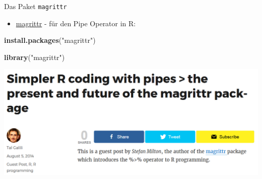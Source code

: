 \documentclass[ignorenonframetext,]{beamer}
\newenvironment{Shaded}{}{}
\newcommand{\KeywordTok}[1]{\textcolor[rgb]{0.00,0.44,0.13}{\textbf{{#1}}}}
\newcommand{\StringTok}[1]{\textcolor[rgb]{0.25,0.44,0.63}{{#1}}}
\newcommand{\NormalTok}[1]{{#1}}
\providecommand{\tightlist}{%
\setlength{\itemsep}{0pt}\setlength{\parskip}{0pt}}
\begin{document}
\begin{frame}[fragile]{Das Paket \texttt{magrittr}}

\begin{itemize}
\tightlist
\item
  \href{https://cran.r-project.org/web/packages/magrittr/index.html}{magrittr}
  - für den Pipe Operator in R:
\end{itemize}

\begin{Shaded}
\begin{Highlighting}[]
\KeywordTok{install.packages}\NormalTok{(}\StringTok{"magrittr"}\NormalTok{)}
\end{Highlighting}
\end{Shaded}

\begin{Shaded}
\begin{Highlighting}[]
\KeywordTok{library}\NormalTok{(}\StringTok{"magrittr"}\NormalTok{)}
\end{Highlighting}
\end{Shaded}

\includegraphics{./tex2pdf.956/8ac87890df6a93266eed3c9d0aeb31b8524671e7.png}

\end{frame}
\end{document}
